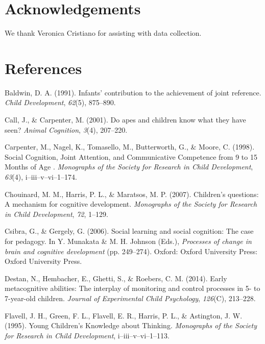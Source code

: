 \documentclass[10pt, letterpaper]{article}
\begin{document}
\section{Acknowledgements}\label{acknowledgements}

We thank Veronica Cristiano for assisting with data collection.

\section{References}\label{references}

\setlength{\parindent}{-0.1in} \setlength{\leftskip}{0.125in} \noindent

\hypertarget{refs}{}
\hypertarget{ref-Baldwin1991}{}
Baldwin, D. A. (1991). Infants' contribution to the achievement of joint
reference. \emph{Child Development}, \emph{62}(5), 875--890.

\hypertarget{ref-Call2001}{}
Call, J., \& Carpenter, M. (2001). Do apes and children know what they
have seen? \emph{Animal Cognition}, \emph{3}(4), 207--220.

\hypertarget{ref-Carpenter1998}{}
Carpenter, M., Nagel, K., Tomasello, M., Butterworth, G., \& Moore, C.
(1998). Social Cognition, Joint Attention, and Communicative Competence
from 9 to 15 Months of Age . \emph{Monographs of the Society for
Research in Child Development}, \emph{63}(4), i--iii--v--vi--1--174.

\hypertarget{ref-Chouinard2007}{}
Chouinard, M. M., Harris, P. L., \& Maratsos, M. P. (2007). Children's
questions: A mechanism for cognitive development. \emph{Monographs of
the Society for Research in Child Development}, \emph{72}, 1--129.

\hypertarget{ref-Csibra2006}{}
Csibra, G., \& Gergely, G. (2006). Social learning and social cognition:
The case for pedagogy. In Y. Munakata \& M. H. Johnson (Eds.),
\emph{Processes of change in brain and cognitive development} (pp.
249--274). Oxford: Oxford University Press: Oxford University Press.

\hypertarget{ref-Destan2014}{}
Destan, N., Hembacher, E., Ghetti, S., \& Roebers, C. M. (2014). Early
metacognitive abilities: The interplay of monitoring and control
processes in 5- to 7-year-old children. \emph{Journal of Experimental
Child Psychology}, \emph{126}(C), 213--228.

\hypertarget{ref-Flavell1995}{}
Flavell, J. H., Green, F. L., Flavell, E. R., Harris, P. L., \&
Astington, J. W. (1995). Young Children's Knowledge about Thinking.
\emph{Monographs of the Society for Research in Child Development},
i--iii--v--vi--1--113.
\end{document}
